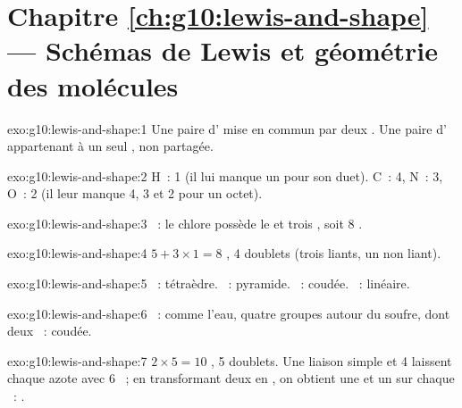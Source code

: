 \section*{Chapitre \ref{ch:g10:lewis-and-shape} --- Schémas de Lewis et géométrie des molécules}

\begin{solution}{exo:g10:lewis-and-shape:1}
Une paire d' mise en commun par deux . Une paire
d' appartenant à un seul , non partagée.
\end{solution}

\begin{solution}{exo:g10:lewis-and-shape:2}
H~: 1 (il lui manque un  pour son duet). C~: 4, N~: 3, O~: 2 (il
leur manque 4, 3 et 2  pour un octet).
\end{solution}

\begin{solution}{exo:g10:lewis-and-shape:3}
~: le chlore possède le
 et trois , soit 8 .
\end{solution}

\begin{solution}{exo:g10:lewis-and-shape:4}
$5 + 3 \times 1 = 8$ , 4 doublets (trois liants, un non liant).
\end{solution}

\begin{solution}{exo:g10:lewis-and-shape:5}
~: tétraèdre. ~: pyramide. ~: coudée. ~:
linéaire.
\end{solution}

\begin{solution}{exo:g10:lewis-and-shape:6}
~: comme l'eau, quatre groupes
autour du soufre, dont deux ~: coudée.
\end{solution}

\begin{solution}{exo:g10:lewis-and-shape:7}
$2 \times 5 = 10$ , 5 doublets. Une liaison simple et 4  laissent chaque azote avec 6 ~; en transformant deux
 en , on obtient une  et
un  sur chaque ~:
.
\end{solution}

